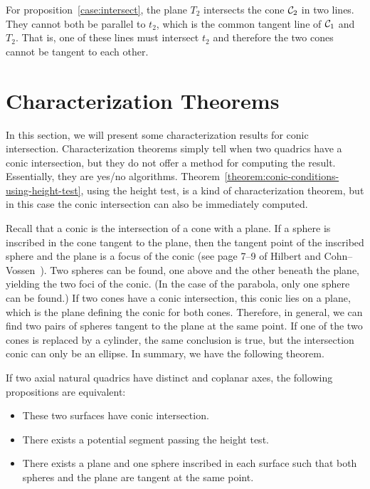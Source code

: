      For proposition~\ref{case:intersect}, the plane $T_2$ intersects the cone
${\cal C}_2$ in two lines.  They cannot both be parallel to $t_2$, which is
the common tangent line of ${\cal C}_1$ and $T_2$.  That is, one of these lines
must intersect $t_2$ and therefore the two cones cannot be tangent to each
other.\ \ \ \QED


\section{Characterization Theorems}
\label{section:characterization}
     In this section, we will present some characterization results for conic
intersection.  Characterization theorems simply tell when two quadrics have a
conic intersection, but they do not offer a method for computing the result.
Essentially, they are yes/no algorithms.
Theorem~\ref{theorem:conic-conditions-using-height-test}, using the height
test, is a kind of characterization theorem, but in this case the conic
intersection can also be immediately computed.

     Recall that a conic is the intersection of a cone with a plane.  If a 
sphere is inscribed in the cone tangent to the plane, then the tangent point of
the inscribed sphere and the plane is a focus of the conic (see page 7--9 of 
Hilbert and Cohn--Vossen~\cite{hilbert:1983}).  Two spheres can be found, one 
above and the other beneath the plane, yielding the two foci of the conic. (In
the case of the parabola, only one sphere can be found.)   If two cones have a 
conic intersection, this conic lies on a plane, which is the plane defining 
the conic for both cones.  Therefore, in general, we can find two pairs of 
spheres tangent to the plane at the same point.  If one of the two cones is 
replaced by a cylinder, the same conclusion is true, but the intersection 
conic can only be an ellipse.  In summary, we have the following theorem.

\begin{theorem}
     If two axial natural quadrics have distinct and coplanar axes, the
following propositions are equivalent:
\begin{itemize}
     \item These two surfaces have conic intersection.
     \item There exists a potential segment passing the height test.
     \item There exists a plane and one sphere inscribed in each surface such 
          that both spheres and the plane are tangent at the same point.
\end{itemize}
\end{theorem}

